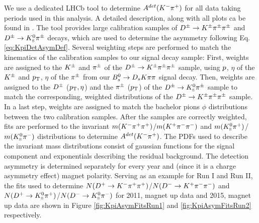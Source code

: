 We use a dedicated LHCb tool to determine $A^{det}(\Km\pip)$ for all data taking periods used in this analysis. A detailed description, along with all plots ca be found in \cite{Davis:2310213}.
The tool provides large calibration samples of $\Dpm\to\Kpm\pipm\pipm$ and $\Dpm\to\KS\pipm$ decays, which are used to determine the asymmetry following Eq. \ref{eq:KpiDetAsymDef}. 
Several weighting steps are performed to match the kinematics of the calibration samples to our signal decay sample: \newline
First, weights are assigned to the $\Kpm$ and $\pipm$ of the $\Dpm\to\Kpm\pipm\pipm$ sample, using $\ptot$, $\eta$ of the $\Kpm$ and $\pt$, $\eta$ of the $\pipm$ from our $\Bs\to\Ds\kaon\pion\pion$ signal decay.
Then, weights are assigned to the $\Dpm$ ($\pt, \eta$) and the $\pipm$ ($\pt$) of the $\Dpm\to\KS\pipm$ sample to match the corresponding, weighted distributions of the $\Dpm\to\Kpm\pipm\pipm$ sample.
In a last step, weights are assigned to match the bachelor pions $\phi$ distributions between the two calibration samples. \newline
After the samples are correctly weighted, fits are performed to the invariant $m(\Km\pip\pip)$/$m(\Kp\pim\pim)$ and $m(\KS\pip)$/$m(\KS\pim)$ distributions to determine $A^{det}(\Km\pip)$. 
The PDFs used to describe the invariant mass distributions consist of gaussian functions for the signal component and exponentials describing the residual background.
The detection asymmetry is determined separately for every year and (since it is a charge asymmetry effect) magnet polarity. 
Serving as an example for Run I and Run II, the fits used to determine $N(\Dp\to\Km\pip\pip)$/$N(\Dm\to\Kp\pim\pim)$ and $N(\Dp\to\KS\pip)$/$N(\Dm\to\KS\pim)$ 
for 2011, magnet up data and 2015, magnet up data are shown in Figure \ref{fig:KpiAsymFitsRun1} and \ref{fig:KpiAsymFitsRun2} respectively.



